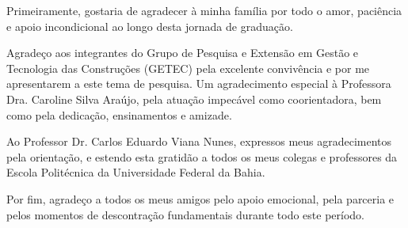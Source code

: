 \begin{agradecimentos}
	Primeiramente, gostaria de agradecer à minha família por todo o amor, paciência e apoio incondicional ao longo desta jornada de graduação.
	
	Agradeço aos integrantes do Grupo de Pesquisa e Extensão em Gestão e Tecnologia das Construções (GETEC) pela excelente convivência e por me apresentarem a este tema de pesquisa. Um agradecimento especial à Professora Dra. Caroline Silva Araújo, pela atuação impecável como coorientadora, bem como pela dedicação, ensinamentos e amizade.
	
	Ao Professor Dr. Carlos Eduardo Viana Nunes, expressos meus agradecimentos pela orientação, e estendo esta gratidão a todos os meus colegas e professores da Escola Politécnica da Universidade Federal da Bahia.
	
	Por fim, agradeço a todos os meus amigos pelo apoio emocional, pela parceria e pelos momentos de descontração fundamentais durante todo este período.
\end{agradecimentos}